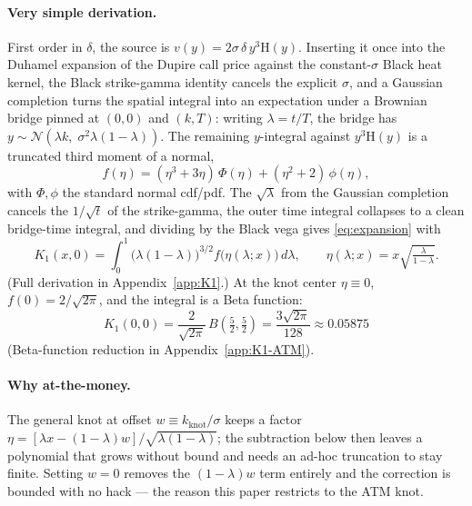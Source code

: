 \documentclass[11pt]{article}
\newcommand{\Hev}{\mathrm{H}}
\begin{document}
\paragraph{Very simple derivation.}
First order in $\delta$, the source is $v(y)=2\sigma\,\delta\,y^3\Hev(y)$.
Inserting it once into the Duhamel expansion of the Dupire call price
against the constant-$\sigma$ Black heat kernel, the Black strike-gamma
identity cancels the explicit $\sigma$, and a Gaussian completion turns the
spatial integral into an expectation under a Brownian bridge pinned at
$(0,0)$ and $(k,T)$: writing $\lambda=t/T$, the bridge has
$y\sim\mathcal N(\lambda k,\;\sigma^2\lambda(1-\lambda))$. The remaining
$y$-integral against $y^3\Hev(y)$ is a truncated third moment of a normal,
\begin{equation}
f(\eta)=(\eta^3+3\eta)\,\Phi(\eta)+(\eta^2+2)\,\phi(\eta),
\end{equation}
with $\Phi,\phi$ the standard normal cdf/pdf. The $\sqrt\lambda$ from the
Gaussian completion cancels the $1/\sqrt t$ of the strike-gamma, the outer
time integral collapses to a clean bridge-time integral, and dividing by
the Black vega gives \eqref{eq:expansion} with
\begin{equation}
\boxed{\;K_1(x,0)=\int_0^1\big(\lambda(1-\lambda)\big)^{3/2}
   f\big(\eta(\lambda;x)\big)\,d\lambda,\qquad
   \eta(\lambda;x)=x\sqrt{\tfrac{\lambda}{1-\lambda}}.\;}
\label{eq:K1}
\end{equation}
(Full derivation in Appendix~\ref{app:K1}.)
At the knot center $\eta\equiv0$, $f(0)=2/\sqrt{2\pi}$, and the integral is
a Beta function:
\begin{equation}
K_1(0,0)=\frac{2}{\sqrt{2\pi}}\,B\!\left(\tfrac52,\tfrac52\right)
=\frac{3\sqrt{2\pi}}{128}\approx 0.05875
\end{equation}
(Beta-function reduction in Appendix~\ref{app:K1-ATM}).

\paragraph{Why at-the-money.} The general knot at offset
$w \equiv k_{\mathrm{knot}}/\sigma$ keeps a factor $\eta=[\lambda x-(1-\lambda)w]/
\sqrt{\lambda(1-\lambda)}$; the subtraction below then leaves a polynomial
that grows without bound and needs an ad-hoc truncation to stay finite.
Setting $w=0$ removes the $(1-\lambda)w$ term entirely and the correction is
bounded with no hack --- the reason this paper restricts to the ATM knot.
\end{document}
